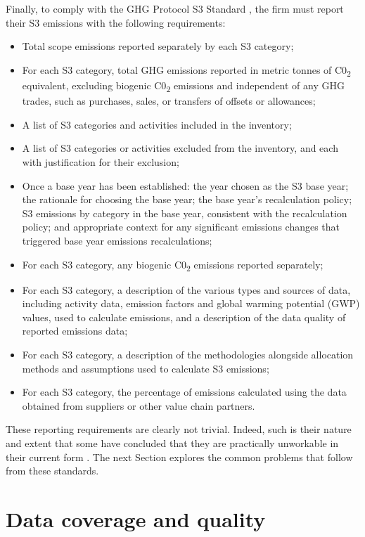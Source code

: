 \documentclass[12pt,twoside]{report}
\begin{document}
\\ \\
Finally, to comply with the GHG Protocol S3 Standard \cite{ghgscope32013}, the firm must report their S3 emissions with the following requirements:
\begin{itemize}
	\item Total scope emissions reported separately by each S3 category;
	\item For each S3 category, total GHG emissions reported in metric tonnes of C0\textsubscript{2} equivalent, excluding biogenic C0\textsubscript{2} emissions and independent of any GHG trades, such as purchases, sales, or transfers of offsets or allowances;
	\item A list of S3 categories and activities included in the inventory;
	\item A list of S3 categories or activities excluded from the inventory, and each with justification for their exclusion;
	\item Once a base year has been established: the year chosen as the S3 base year; the rationale for choosing the base year; the base year's recalculation policy; S3 emissions by category in the base year, consistent with the recalculation policy; and appropriate context for any significant emissions changes that triggered base year emissions recalculations;
	\item For each S3 category, any biogenic C0\textsubscript{2} emissions reported separately; 
	\item For each S3 category, a description of the various types and sources of data, including activity data, emission factors and global warming potential (GWP) values, used to calculate emissions, and a description of the data quality of reported emissions data;
	\item For each S3 category, a description of the methodologies alongside allocation methods and assumptions used to calculate S3 emissions;
	\item For each S3 category, the percentage of emissions calculated using the data obtained from suppliers or other value chain partners.
\end{itemize}
These reporting requirements are clearly not trivial. Indeed, such is their nature and extent that some have concluded that they are practically unworkable in their current form \cite{patchell2018}. The next Section explores the common problems that follow from these standards.

\section{Data coverage and quality}\label{sec:Scope3Challenges}
\end{document}
